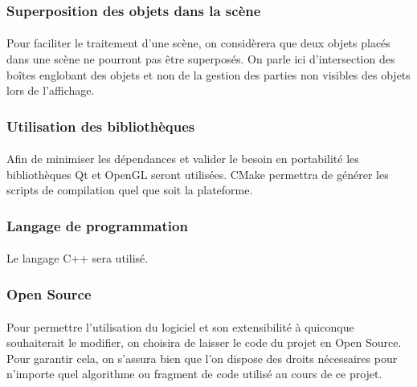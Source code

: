 \subsubsection{Superposition des objets dans la scène}

\paragraph{}
	Pour faciliter le traitement d’une scène, on considèrera que deux objets placés dans une scène ne pourront pas être superposés. On parle ici d’intersection des boîtes englobant des objets et non de la gestion des parties non visibles des objets lors de l’affichage.

\subsubsection{Utilisation des bibliothèques}

\paragraph{}
	Afin de minimiser les dépendances et valider le besoin en portabilité les bibliothèques Qt et OpenGL seront utilisées. CMake permettra de générer les scripts de compilation quel que soit la plateforme.
	
\subsubsection{Langage de programmation}

\paragraph{}
	Le langage C++ sera utilisé.

\subsubsection{Open Source}

\paragraph{}
	Pour permettre l’utilisation du logiciel et son extensibilité à quiconque souhaiterait le modifier, on choisira de laisser le code du projet en Open Source. Pour garantir cela, on s’assura bien que l’on dispose des droits nécessaires pour n’importe quel algorithme ou fragment de code utilisé au cours de ce projet.
	
